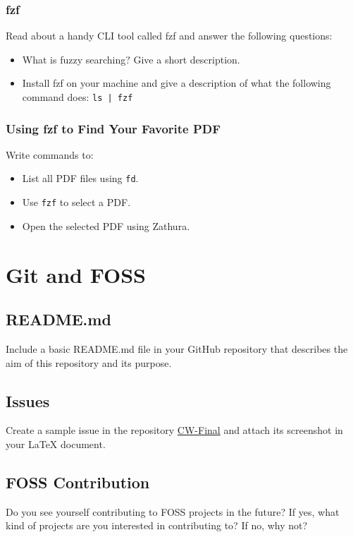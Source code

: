 \documentclass{article}
\begin{document}
\subsubsection{fzf}
Read about a handy CLI tool called fzf and answer the following questions:
\begin{itemize}
    \item What is fuzzy searching? Give a short description.
    \item Install fzf on your machine and give a description of what the following command does:
    \texttt{ls | fzf}
\end{itemize}

\subsubsection{Using fzf to Find Your Favorite PDF}
Write commands to:
\begin{itemize}
    \item List all PDF files using \texttt{fd}.
    \item Use \texttt{fzf} to select a PDF.
    \item Open the selected PDF using Zathura.
\end{itemize}

\section{Git and FOSS}
\subsection{README.md}
Include a basic README.md file in your GitHub repository that describes the aim of this repository and its purpose.

\subsection{Issues}
Create a sample issue in the repository \href{https://github.com/MiliAxe/CW-Final}{CW-Final} and attach its screenshot in your LaTeX document.

\subsection{FOSS Contribution}
Do you see yourself contributing to FOSS projects in the future? If yes, what kind of projects are you interested in contributing to? If no, why not?
\end{document}
